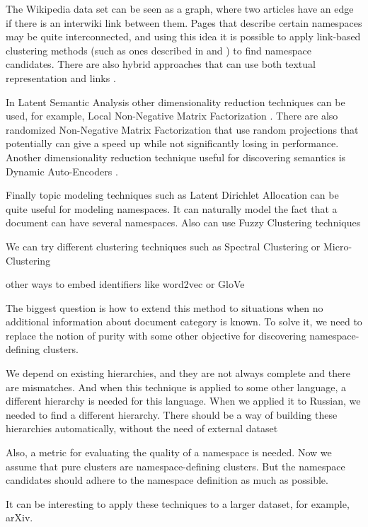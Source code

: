 The Wikipedia data set can be seen as a graph, where two articles have 
an edge if there is an interwiki link between them. Pages that describe 
certain namespaces may be quite interconnected, and using this idea 
it is possible to apply link-based clustering methods (such as ones 
described in \cite{botafogo1991identifying} and \cite{johnson1996adaptive}) to 
find namespace candidates. There are also hybrid approaches that
can use both textual representation and links \cite{oikonomakou2005review}.

In Latent Semantic Analysis other dimensionality reduction techniques 
can be used, for example, Local Non-Negative Matrix Factorization \cite{li2001learning}. 
There are also randomized Non-Negative Matrix Factorization that use 
random projections \cite{wang2010efficient} \cite{damle2014random} 
that potentially can give a speed up while not significantly losing 
in performance. Another dimensionality reduction technique useful for 
discovering semantics is Dynamic Auto-Encoders \cite{mirowski2010dynamic}.

Finally topic modeling techniques such as Latent Dirichlet Allocation 
\cite{blei2003latent} can be quite useful for modeling namespaces. 
It can naturally model the fact that a document can have several namespaces. 
Also can use Fuzzy Clustering techniques \cite{baraldi1999survey}


We can try different clustering techniques such as Spectral Clustering \cite{ng2002spectral}
or Micro-Clustering \cite{uno2015micro}

other ways to embed identifiers like word2vec \cite{mikolov2013efficient}
or GloVe \cite{pennington2014glove}


The biggest question is how to extend this method to situations when 
no additional information about document category is known. To solve 
it, we need to replace the notion of purity with some other objective 
for discovering namespace-defining clusters. 

We depend on existing hierarchies, and they are not always complete and 
there are mismatches. And when this technique is applied to some
other language, a different hierarchy is needed for this language. When 
we applied it to Russian, we needed to find a different hierarchy.
There should be a way of building these hierarchies
automatically, without the need of external dataset


Also, a metric for evaluating the quality of a namespace is needed. 
Now we assume that pure clusters are namespace-defining clusters. But the namespace
candidates should adhere to the namespace definition as much as possible. 


It can be interesting to apply these techniques to a larger dataset, for example, arXiv.




